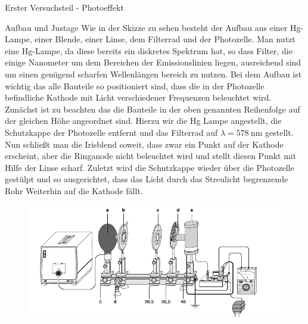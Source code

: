 \documentclass[pdftex, a4paper,11pt, twoside, ngerman]{report}
\begin{document}
         
         
         
  \begin{chapter}{Erster Versuchsteil - Photoeffekt}
    \label{chp:Photoeffekt}
   
   
   
    \begin{section}{Aufbau und Justage}
      \label{chp:photoeffekt:sec:AufbauJustage}
      Wie in der Skizze zu sehen besteht der Aufbau aus einer Hg-Lampe, einer
      Blende, einer Linse, dem Filterrad und der Photozelle. Man nutzt eine 
      Hg-Lampe, da diese bereits ein diskretes Spektrum hat, so dass Filter, 
      die einige Nanometer um dem Bereichen der Emissionslinien liegen,
      ausreichend sind um einen genügend scharfen Wellenlängen bereich zu
      nutzen. Bei dem Aufbau ist wichtig das alle Bauteile so positioniert
      sind, dass die in der Photozelle befindliche Kathode mit Licht
      verschiedener Frequenzen beleuchtet wird. Zunächst ist zu beachten das
      die Bauteile in der oben genannten Reihenfolge auf der gleichen Höhe
      angeordnet sind. Hierzu wir die Hg Lampe angestellt, die Schutzkappe der
      Photozelle entfernt und das Filterrad auf $\lambda =
      \SI{578}{\nano\meter}$ gestellt. Nun schließt man die Irisblend soweit,
      dass zwar ein Punkt auf der Kathode erscheint, aber die Ringanode nicht
      beleuchtet wird und stellt diesen Punkt mit Hilfe der Linse scharf.
      Zuletzt wird die Schutzkappe wieder über die Photozelle gestülpt und so
      ausgerichtet, dass das Licht durch das Streulicht begrenzende Rohr
      Weiterhin auf die Kathode fällt.
      \begin{figure}[htbp]
        \begin{center}
          \includegraphics[width=.9\textwidth]{Figures/Planckaufbau.png}

\end{center}
\end{figure}
\end{section}
\end{chapter}
\end{document}
